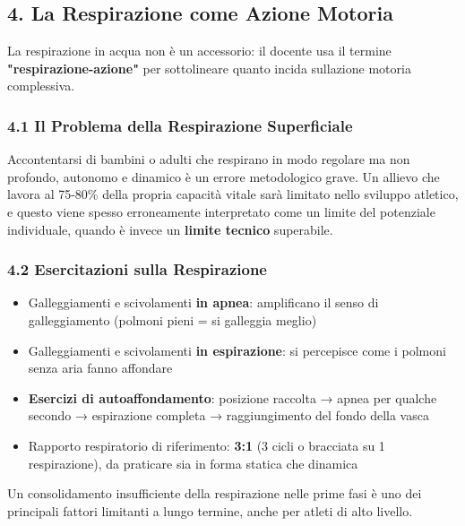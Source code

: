 \documentclass[a4paper,11pt]{article}
\providecommand{\tightlist}{%
  \setlength{\itemsep}{0pt}\setlength{\parskip}{0pt}}
\begin{document}
\subsection{4. La Respirazione come Azione
      Motoria}\label{la-respirazione-come-azione-motoria}

La respirazione in acqua non è un accessorio: il docente usa il termine
\textbf{"respirazione-azione"} per sottolineare quanto incida
sull\textquotesingle azione motoria complessiva.

\subsubsection{4.1 Il Problema della Respirazione
      Superficiale}\label{il-problema-della-respirazione-superficiale}

Accontentarsi di bambini o adulti che respirano in modo regolare ma non
profondo, autonomo e dinamico è un errore metodologico grave. Un allievo
che lavora al 75-80\% della propria capacità vitale sarà limitato nello
sviluppo atletico, e questo viene spesso erroneamente interpretato come
un limite del potenziale individuale, quando è invece un \textbf{limite
      tecnico} superabile.

\subsubsection{4.2 Esercitazioni sulla
      Respirazione}\label{esercitazioni-sulla-respirazione}

\begin{itemize}
      \tightlist
      \item
            Galleggiamenti e scivolamenti \textbf{in apnea}: amplificano il senso
            di galleggiamento (polmoni pieni = si galleggia meglio)
      \item
            Galleggiamenti e scivolamenti \textbf{in espirazione}: si percepisce
            come i polmoni senza aria fanno affondare
      \item
            \textbf{Esercizi di autoaffondamento}: posizione raccolta → apnea per
            qualche secondo → espirazione completa → raggiungimento del fondo
            della vasca
      \item
            Rapporto respiratorio di riferimento: \textbf{3:1} (3 cicli o
            bracciata su 1 respirazione), da praticare sia in forma statica che
            dinamica
\end{itemize}

Un consolidamento insufficiente della respirazione nelle prime fasi è
uno dei principali fattori limitanti a lungo termine, anche per atleti
di alto livello.
\end{document}

